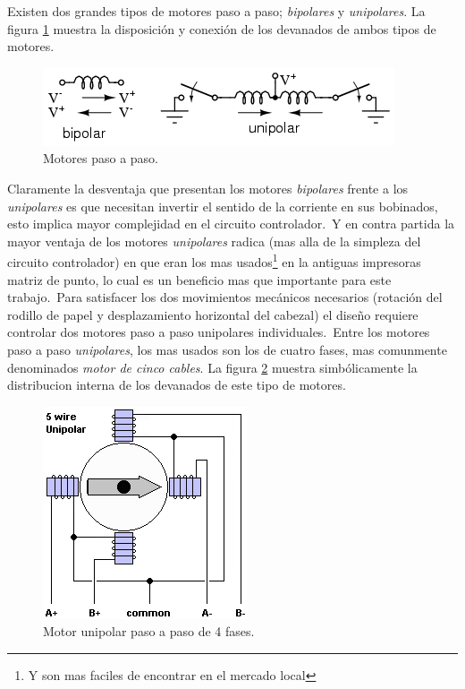 Existen dos grandes tipos de motores paso a paso; \emph{bipolares} y
\emph{unipolares}. La figura \ref{fig:stepper_motors} muestra la disposici\'on
y conexi\'on de los devanados de ambos tipos de motores. 


\begin{figure}[htp]
\centering
\includegraphics[scale=0.7]{./img/02440.png}
\caption{Motores paso a paso.}
\label{fig:stepper_motors}
\end{figure}

Claramente la desventaja que presentan los motores \emph{bipolares} frente a
los \emph{unipolares} es que necesitan invertir el sentido de la corriente en
sus bobinados, esto implica mayor complejidad en el circuito controlador.\
Y en contra partida la mayor ventaja de los motores \emph{unipolares} radica
(mas alla de la simpleza del circuito controlador) en que eran los mas
usados\footnote{Y son mas faciles de encontrar en el mercado local} en la
antiguas impresoras matriz de punto, lo cual es un beneficio mas que importante
para este trabajo.\
Para satisfacer los dos movimientos mec\'anicos necesarios (rotaci\'on del
rodillo de papel y desplazamiento horizontal del cabezal) el dise\~no requiere
controlar dos motores paso a paso unipolares individuales.\
Entre los motores paso a paso \emph{unipolares}, los mas usados son los de
cuatro fases, mas comunmente denominados \emph{motor de cinco cables}. La
figura \ref{fig:stepper_motor_5_wire} muestra simb\'olicamente la distribucion
interna de los devanados de este tipo de motores.

\begin{figure}[htp]
\centering
\includegraphics[scale=0.5]{./img/5wire.png}
\caption{Motor unipolar paso a paso de 4 fases.}
\label{fig:stepper_motor_5_wire}
\end{figure}

